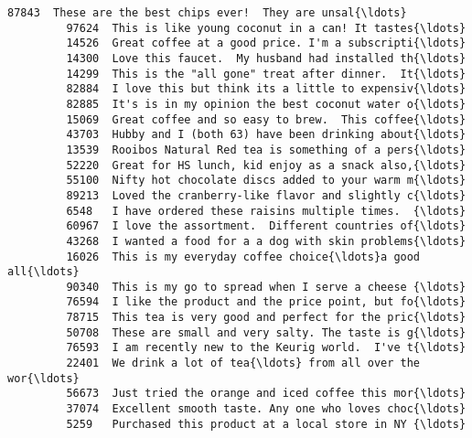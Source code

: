 \documentclass[11pt]{article}
\begin{document}
\begin{Verbatim}[commandchars=\\\{\}]
         87843  These are the best chips ever!  They are unsal{\ldots}   
         97624  This is like young coconut in a can! It tastes{\ldots}   
         14526  Great coffee at a good price. I'm a subscripti{\ldots}   
         14300  Love this faucet.  My husband had installed th{\ldots}   
         14299  This is the "all gone" treat after dinner.  It{\ldots}   
         82884  I love this but think its a little to expensiv{\ldots}   
         82885  It's is in my opinion the best coconut water o{\ldots}   
         15069  Great coffee and so easy to brew.  This coffee{\ldots}   
         43703  Hubby and I (both 63) have been drinking about{\ldots}   
         13539  Rooibos Natural Red tea is something of a pers{\ldots}   
         52220  Great for HS lunch, kid enjoy as a snack also,{\ldots}   
         55100  Nifty hot chocolate discs added to your warm m{\ldots}   
         89213  Loved the cranberry-like flavor and slightly c{\ldots}   
         6548   I have ordered these raisins multiple times.  {\ldots}   
         60967  I love the assortment.  Different countries of{\ldots}   
         43268  I wanted a food for a a dog with skin problems{\ldots}   
         16026  This is my everyday coffee choice{\ldots}a good all{\ldots}   
         90340  This is my go to spread when I serve a cheese {\ldots}   
         76594  I like the product and the price point, but fo{\ldots}   
         78715  This tea is very good and perfect for the pric{\ldots}   
         50708  These are small and very salty. The taste is g{\ldots}   
         76593  I am recently new to the Keurig world.  I've t{\ldots}   
         22401  We drink a lot of tea{\ldots} from all over the wor{\ldots}   
         56673  Just tried the orange and iced coffee this mor{\ldots}   
         37074  Excellent smooth taste. Any one who loves choc{\ldots}   
         5259   Purchased this product at a local store in NY {\ldots}   
         

\end{Verbatim}
\end{document}
